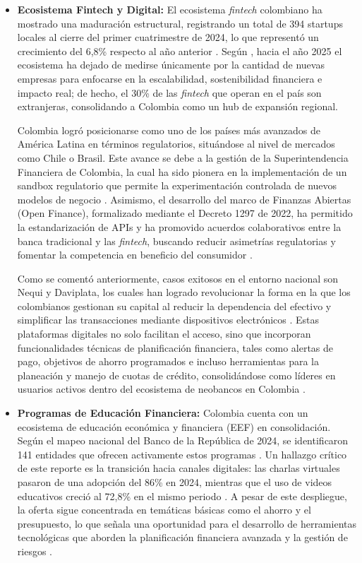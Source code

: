 \begin{itemize}
	\item \textbf{Ecosistema Fintech y Digital:} El ecosistema \textit{fintech} colombiano ha mostrado una maduración estructural, registrando un total de 394 startups locales al cierre del primer cuatrimestre de 2024, lo que representó un crecimiento del 6,8\% respecto al año anterior \parencite[p. 8]{Finnovista2024}. Según \textcite{Baca2025}, hacia el año 2025 el ecosistema ha dejado de medirse únicamente por la cantidad de nuevas empresas para enfocarse en la escalabilidad, sostenibilidad financiera e impacto real; de hecho, el 30\% de las \textit{fintech} que operan en el país son extranjeras, consolidando a Colombia como un hub de expansión regional.
	
	Colombia logró posicionarse como uno de los países más avanzados de América Latina en términos regulatorios, situándose al nivel de mercados como Chile o Brasil. Este avance se debe a la gestión de la Superintendencia Financiera de Colombia, la cual ha sido pionera en la implementación de un sandbox regulatorio que permite la experimentación controlada de nuevos modelos de negocio \parencite[p. 2]{Gaitan2023}. Asimismo, el desarrollo del marco de Finanzas Abiertas (Open Finance), formalizado mediante el Decreto 1297 de 2022, ha permitido la estandarización de APIs y ha promovido acuerdos colaborativos entre la banca tradicional y las \textit{fintech}, buscando reducir asimetrías regulatorias y fomentar la competencia en beneficio del consumidor \parencite[p. 3]{Gaitan2023}.
	
	Como se comentó anteriormente, casos exitosos en el entorno nacional son Nequi y Daviplata, los cuales han logrado revolucionar la forma en la que los colombianos gestionan su capital al reducir la dependencia del efectivo y simplificar las transacciones mediante dispositivos electrónicos \parencite[p. 1]{Gaitan2023}. Estas plataformas digitales no solo facilitan el acceso, sino que incorporan funcionalidades técnicas de planificación financiera, tales como alertas de pago, objetivos de ahorro programados e incluso herramientas para la planeación y manejo de cuotas de crédito, consolidándose como líderes en usuarios activos dentro del ecosistema de neobancos en Colombia \parencite{Pulzo01, Gaitan2023}.
	
	\item \textbf{Programas de Educación Financiera:} Colombia cuenta con un ecosistema de educación económica y financiera (EEF) en consolidación. Según el mapeo nacional del Banco de la República de 2024, se identificaron 141 entidades que ofrecen activamente estos programas \parencite[p. 2]{Banrep_Mapeo2024}. Un hallazgo crítico de este reporte es la transición hacia canales digitales: las charlas virtuales pasaron de una adopción del 86\% en 2024, mientras que el uso de videos educativos creció al 72,8\% en el mismo periodo \parencite[p. 10]{Banrep_Mapeo2024}. A pesar de este despliegue, la oferta sigue concentrada en temáticas básicas como el ahorro y el presupuesto, lo que señala una oportunidad para el desarrollo de herramientas tecnológicas que aborden la planificación financiera avanzada y la gestión de riesgos \parencite[p. 5]{Banrep_Mapeo2024}.
	

\end{itemize}
